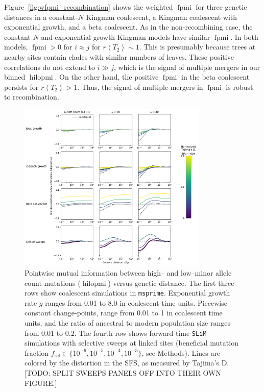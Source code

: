 \documentclass[11pt, letterpaper]{article}   	%
\newcommand{\Fig}[1]{Figure~\ref{#1}}
\newcommand{\E}[1]{\left< #1 \right>}
\DeclareMathOperator{\fpmi}{fpmi}
\DeclareMathOperator{\hilopmi}{hilopmi}
\begin{document}
\Fig{fig:wfpmi_recombination} shows the weighted $\fpmi$ for three genetic distances in a constant-$N$ Kingman coalescent, a Kingman coalescent with exponential growth, and a beta coalescent.
As in the non-recombining case, the constant-$N$ and exponential-growth Kingman models have similar $\fpmi$.
In both models, $\fpmi > 0$ for $i\approx j$ for $r\E{T_2} \sim 1$.
This is presumably because trees at nearby sites contain clades with similar numbers of leaves.
These positive correlations do not extend to $i \gg j$, which is the signal of multiple mergers in our binned $\hilopmi$.
On the other hand, the positive $\fpmi$ in the beta coalescent persists for $r\E{T_2} > 1$.
Thus, the signal of multiple mergers in $\fpmi$ is robust to recombination.

\begin{figure}
\centering
\includegraphics[width=0.8\textwidth]{figures/figure5.pdf}
\caption{Pointwise mutual information between high-- and low--minor allele count mutations ($\hilopmi$) versus genetic distance. The first three rows show coalescent simulations in \texttt{msprime}. Exponential growth rate $g$ ranges from 0.01 to 8.0 in coalescent time units. Piecewise constant change-points, range from 0.01 to 1 in coalescent time units, and the ratio of ancestral to modern population size ranges from 0.01 to 0.2. The fourth row shows forward-time \texttt{SLiM} simulations with selective sweeps at linked sites (beneficial mutation fraction $f_{\text{sel}} \in \{10^{-6}, 10^{-5}, 10^{-4}, 10^{-3}\}$, see Methods). Lines are colored by the distortion in the SFS, as measured by Tajima's D. [TODO: SPLIT SWEEPS PANELS OFF INTO THEIR OWN FIGURE.]\label{fig:hilo_vs_d}}
\end{figure}
\end{document}
